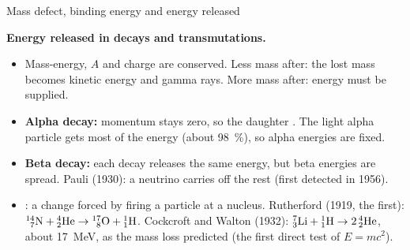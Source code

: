 \begin{formulacard}[combine={$E = mc^2$ and $\mathrm{u} = 931.5\ \mathrm{MeV}/c^2$}]{Mass defect, binding energy and energy released}
  \begin{symbols}
  \end{symbols}
\end{formulacard}

\textbf{Energy released in decays and transmutations.}
\begin{itemize}
  \item Mass-energy, $A$ and charge are conserved. Less mass after: the lost mass becomes
        kinetic energy and gamma rays. More mass after: energy must be supplied.
  \item \textbf{Alpha decay:} momentum stays zero, so the daughter . The light
        alpha particle gets most of the energy (about \qty{98}{\percent}), so alpha energies
        are fixed.
  \item \textbf{Beta decay:} each decay releases the same energy, but beta energies are
        spread. Pauli (1930): a neutrino carries off the rest (first detected in 1956).
  \item {}: a change forced by firing a particle at a nucleus.
        Rutherford (1919, the first): $\chFourNuc{14}{7}{N} + \chFourAlpha \to
        \chFourNuc{17}{8}{O} + \chFourNuc{1}{1}{H}$. Cockcroft and Walton (1932):
        $\chFourNuc{7}{3}{Li} + \chFourNuc{1}{1}{H} \to 2\,\chFourAlpha$, about \qty{17}{MeV},
        as the mass loss predicted (the first direct test of $E = mc^2$).
\end{itemize}

